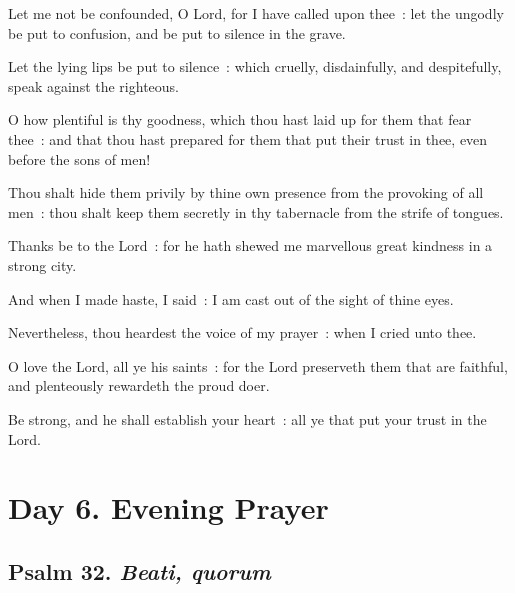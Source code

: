 Let me not be confounded, O Lord, for I have called upon thee~: let the ungodly be put to confusion, and be put to silence in the grave.\par
{}Let the lying lips be put to silence~: which cruelly, disdainfully, and despitefully, speak against the righteous.\par
{}O how plentiful is thy goodness, which thou hast laid up for them that fear thee~: and that thou hast prepared for them that put their trust in thee, even before the sons of men!\par
{}Thou shalt hide them privily by thine own presence from the provoking of all men~: thou shalt keep them secretly in thy tabernacle from the strife of tongues.\par
{}Thanks be to the Lord~: for he hath shewed me marvellous great kindness in a strong city.\par
{}And when I made haste, I said~: I am cast out of the sight of thine eyes.\par
{}Nevertheless, thou heardest the voice of my prayer~: when I cried unto thee.\par
{}O love the Lord, all ye his saints~: for the Lord preserveth them that are faithful, and plenteously rewardeth the proud doer.\par
{}Be strong, and he shall establish your heart~: all ye that put your trust in the Lord.\par


\clearpage
\section*{Day 6. Evening Prayer}

\subsection{Psalm 32. \textit{Beati, quorum}}


